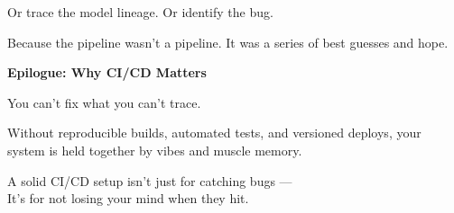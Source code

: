 Or trace the model lineage. Or identify the bug.

Because the pipeline wasn’t a pipeline. It was a series of best guesses and hope.

\vspace{1em}
\textbf{Epilogue: Why CI/CD Matters}

You can’t fix what you can’t trace.

Without reproducible builds, automated tests, and versioned deploys, your system is held together by vibes and muscle memory.

A solid CI/CD setup isn’t just for catching bugs —\\
It’s for not losing your mind when they hit.


